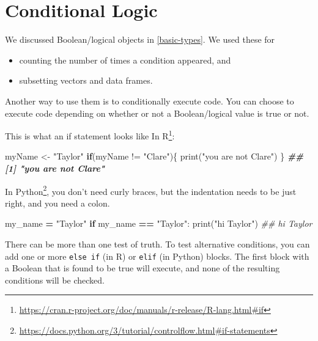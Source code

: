 \documentclass[
  12pt,
  krantz2]{krantz}
\makeatletter
\newenvironment{Shaded}{\begin{snugshade}}{\end{snugshade}}
\newcommand{\BuiltInTok}[1]{#1}
\newcommand{\CommentTok}[1]{\textcolor[rgb]{0.37,0.37,0.37}{\textit{#1}}}
\newcommand{\ControlFlowTok}[1]{\textcolor[rgb]{0.27,0.27,0.27}{\textbf{#1}}}
\newcommand{\DocumentationTok}[1]{\textcolor[rgb]{0.37,0.37,0.37}{\textbf{\textit{#1}}}}
\newcommand{\FunctionTok}[1]{\textcolor[rgb]{0,0,0}{#1}}
\newcommand{\NormalTok}[1]{#1}
\newcommand{\OperatorTok}[1]{\textcolor[rgb]{0.43,0.43,0.43}{\textbf{#1}}}
\newcommand{\OtherTok}[1]{\textcolor[rgb]{0.37,0.37,0.37}{#1}}
\newcommand{\SpecialCharTok}[1]{\textcolor[rgb]{0,0,0}{#1}}
\newcommand{\StringTok}[1]{\textcolor[rgb]{0.5,0.5,0.5}{#1}}
\providecommand{\tightlist}{%
  \setlength{\itemsep}{0pt}\setlength{\parskip}{0pt}}
\renewcommand{\href}[2]{#2\footnote{\url{#1}}}
\newenvironment{kframe}{%
\medskip{}
\setlength{\fboxsep}{.8em}
 \def\at@end@of@kframe{}%
 \ifinner\ifhmode%
  \def\at@end@of@kframe{\end{minipage}}%
  \begin{minipage}{\columnwidth}%
 \fi\fi%
 \def\FrameCommand##1{\hskip\@totalleftmargin \hskip-\fboxsep
 \colorbox{shadecolor}{##1}\hskip-\fboxsep
     \hskip-\linewidth \hskip-\@totalleftmargin \hskip\columnwidth}%
 \MakeFramed {\advance\hsize-\width
   \@totalleftmargin\z@ \linewidth\hsize
   \@setminipage}}%
 {\par\unskip\endMakeFramed%
 \at@end@of@kframe}
\renewenvironment{Shaded}{\begin{kframe}}{\end{kframe}}
\makeatother
\begin{document}
\hypertarget{conditional-logic}{%
\section{Conditional Logic}\label{conditional-logic}}

We discussed Boolean/logical objects in \ref{basic-types}. We used these for

\begin{itemize}
\tightlist
\item
  counting the number of times a condition appeared, and
\item
  subsetting vectors and data frames.
\end{itemize}

Another way to use them is to conditionally execute code. You can choose to execute code depending on whether or not a Boolean/logical value is true or not.

This is what an \href{https://cran.r-project.org/doc/manuals/r-release/R-lang.html\#if}{if statement looks like In R}:

\begin{Shaded}
\begin{Highlighting}[]
\NormalTok{myName }\OtherTok{\textless{}{-}} \StringTok{"Taylor"}
\ControlFlowTok{if}\NormalTok{(myName }\SpecialCharTok{!=} \StringTok{"Clare"}\NormalTok{)\{}
    \FunctionTok{print}\NormalTok{(}\StringTok{"you are not Clare"}\NormalTok{)}
\NormalTok{\}}
\DocumentationTok{\#\# [1] "you are not Clare"}
\end{Highlighting}
\end{Shaded}

\href{https://docs.python.org/3/tutorial/controlflow.html\#if-statements}{In Python}, you don't need curly braces, but the indentation needs to be just right, and you need a colon.

\begin{Shaded}
\begin{Highlighting}[]
\NormalTok{my\_name }\OperatorTok{=} \StringTok{"Taylor"}
\ControlFlowTok{if}\NormalTok{ my\_name }\OperatorTok{==} \StringTok{"Taylor"}\NormalTok{:}
    \BuiltInTok{print}\NormalTok{(}\StringTok{"hi Taylor"}\NormalTok{)}
\CommentTok{\#\# hi Taylor}
\end{Highlighting}
\end{Shaded}

There can be more than one test of truth. To test alternative conditions, you can add one or more \texttt{else\ if} (in R) or \texttt{elif} (in Python) blocks. The first block with a Boolean that is found to be true will execute, and none of the resulting conditions will be checked.
\end{document}
